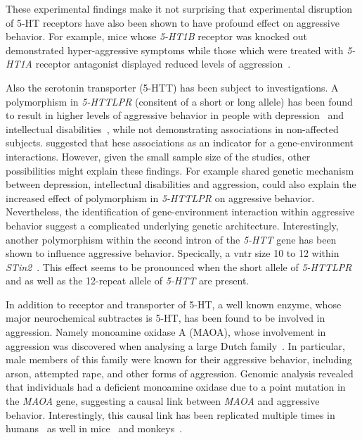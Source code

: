 These experimental findings make it not surprising that experimental disruption of 5-HT receptors have also been shown to have profound effect on aggressive behavior.  
For example, mice whose \textit{5-HT1B} receptor was knocked out demonstrated hyper-aggressive symptoms while those which were treated with \textit{5-HT1A} receptor antagonist displayed reduced levels of aggression~\cite{Saudou1994,Bell1994}.

Also the serotonin transporter (5-HTT) has been subject to investigations.
A polymorphism in \textit{5-HTTLPR} (consitent of a short or long allele)  has been found to result in higher levels of aggressive behavior in  people with depression~\cite{Gonda2011} and intellectual disabilities~\cite{May2010}, while not demonstrating associations in non-affected subjects.
\citet{Anholt2012} suggested that hese associations as an indicator for a gene-environment interactions.
However, given the small sample size of the studies, other possibilities might explain these findings.
For example shared genetic mechanism between depression, intellectual disabilities and aggression, could also explain the increased effect of polymorphism in \textit{5-HTTLPR} on aggressive behavior. 
Nevertheless, the identification of gene-environment interaction within aggressive behavior suggest a complicated underlying genetic architecture.
Interestingly, another polymorphism within the second intron of the \textit{5-HTT} gene has been shown to influence aggressive behavior.
Specically, a \acrfull{vntr} size 10 to 12 within \textit{STin2}~\cite{Aluja2009}. 
This effect seems to be pronounced when the short allele of \textit{5-HTTLPR} and as well as the 12-repeat allele of \textit{5-HTT} are present. 

In addition to receptor and transporter of 5-HT, a well known enzyme, whose major neurochemical subtractes is 5-HT, has been found to be involved in aggression.
Namely monoamine oxidase A (MAOA), whose involvement in aggression was discovered when analysing a large Dutch family~\cite{Brunner1993}.
In particular, male members of this family were known for their aggressive behavior, including arson, attempted rape, and other forms of aggression.
Genomic analysis revealed that individuals had a deficient monoamine oxidase due to a point mutation in the \textit{MAOA} gene, suggesting a causal link between \textit{MAOA} and aggressive behavior.
Interestingly, this causal link has been replicated multiple times in humans~\cite{Huang2004,Manuck2000} as well in mice~\cite{Cases1995} and monkeys~\cite{Newman2005}.

